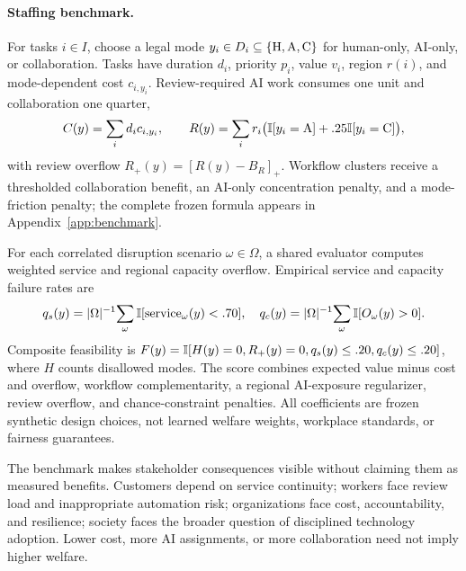 \paragraph{Staffing benchmark.}
For tasks $i\in I$, choose a legal mode $y_i\in D_i\subseteq\{\mathrm{H},\mathrm{A},\mathrm{C}\}$ for human-only, AI-only, or collaboration. Tasks have duration $d_i$, priority $p_i$, value $v_i$, region $r(i)$, and mode-dependent cost $c_{i,y_i}$. Review-required AI work consumes one unit and collaboration one quarter,
\begin{equation}
C(y)=\sum_i d_i c_{i,y_i},\qquad
R(y)=\sum_i r_i\bigl(\mathbb{I}[y_i=\mathrm{A}]+.25\mathbb{I}[y_i=\mathrm{C}]\bigr),
\label{eq:costreview}
\end{equation}
with review overflow $R_+(y)=[R(y)-B_R]_+$. Workflow clusters receive a thresholded collaboration benefit, an AI-only concentration penalty, and a mode-friction penalty; the complete frozen formula appears in Appendix~\ref{app:benchmark}.

For each correlated disruption scenario $\omega\in\Omega$, a shared evaluator computes weighted service and regional capacity overflow. Empirical service and capacity failure rates are
\begin{equation}
q_s(y)=|\Omega|^{-1}\!\sum_\omega \mathbb{I}[\mathrm{service}_\omega(y)<.70],\quad
q_c(y)=|\Omega|^{-1}\!\sum_\omega \mathbb{I}[O_\omega(y)>0].
\label{eq:chance}
\end{equation}
Composite feasibility is
$F(y)=\mathbb{I}[H(y)=0,R_+(y)=0,q_s(y)\le .20,q_c(y)\le .20]$,
where $H$ counts disallowed modes. The score combines expected value minus cost and overflow, workflow complementarity, a regional AI-exposure regularizer, review overflow, and chance-constraint penalties. All coefficients are frozen synthetic design choices, not learned welfare weights, workplace standards, or fairness guarantees.



The benchmark makes stakeholder consequences visible without claiming them as measured benefits. Customers depend on service continuity; workers face review load and inappropriate automation risk; organizations face cost, accountability, and resilience; society faces the broader question of disciplined technology adoption. Lower cost, more AI assignments, or more collaboration need not imply higher welfare.
